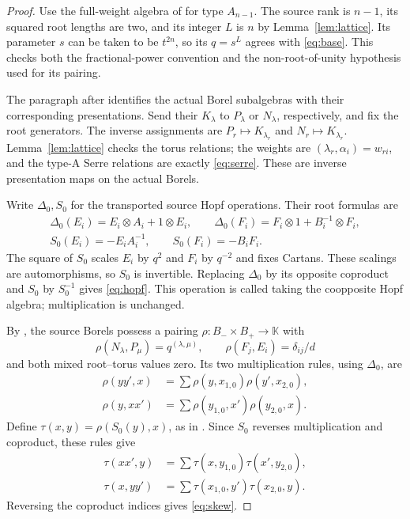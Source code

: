 \documentclass[11pt]{article}
\theoremstyle{definition}
\theoremstyle{remark}
\newcommand{\kk}{\mathbb{K}}
\begin{document}
\begin{proof}
Use the full-weight algebra of \cite[Definition 2.13]{VY} for type $A_{n-1}$. The source rank is $n-1$, its squared root lengths are two, and its integer $L$ is $n$ by Lemma~\ref{lem:lattice}. Its parameter $s$ can be taken to be $t^{2n}$, so its $q=s^L$ agrees with \eqref{eq:base}. This checks both the fractional-power convention and the non-root-of-unity hypothesis used for its pairing.

The paragraph after \cite[Proposition 2.14]{VY} identifies the actual Borel subalgebras with their corresponding presentations. Send their $K_\lambda$ to $P_\lambda$ or $N_\lambda$, respectively, and fix the root generators. The inverse assignments are $P_r\mapsto K_{\lambda_r}$ and $N_r\mapsto K_{\lambda_r}$. Lemma~\ref{lem:lattice} checks the torus relations; the weights are $(\lambda_r,\alpha_i)=w_{ri}$, and the type-A Serre relations are exactly \eqref{eq:serre}. These are inverse presentation maps on the actual Borels.

Write $\Delta_0,S_0$ for the transported source Hopf operations. Their root formulas are
\[
 \begin{gathered}
 \Delta_0(E_i)=E_i\otimes A_i+1\otimes E_i,\qquad
 \Delta_0(F_i)=F_i\otimes1+B_i^{-1}\otimes F_i,\\
 S_0(E_i)=-E_iA_i^{-1},\qquad S_0(F_i)=-B_iF_i.
 \end{gathered}
\]
The square of $S_0$ scales $E_i$ by $q^2$ and $F_i$ by $q^{-2}$ and fixes Cartans. These scalings are automorphisms, so $S_0$ is invertible. Replacing $\Delta_0$ by its opposite coproduct and $S_0$ by $S_0^{-1}$ gives \eqref{eq:hopf}. This operation is called taking the coopposite Hopf algebra; multiplication is unchanged.

By \cite[Proposition 2.73]{VY}, the source Borels possess a pairing $\rho:B_-\times B_+\to\kk$ with
\[
 \rho(N_\lambda,P_\mu)=q^{(\lambda,\mu)},\qquad
 \rho(F_j,E_i)=\delta_{ij}/d
\]
and both mixed root--torus values zero. Its two multiplication rules, using $\Delta_0$, are
\[
 \begin{aligned}
 \rho(yy',x)&=\sum\rho(y,x_{1,0})\rho(y',x_{2,0}),\\
 \rho(y,xx')&=\sum\rho(y_{1,0},x')\rho(y_{2,0},x).
 \end{aligned}
\]
Define $\tau(x,y)=\rho(S_0(y),x)$, as in \cite[Definition 2.74]{VY}. Since $S_0$ reverses multiplication and coproduct, these rules give
\[
 \begin{aligned}
 \tau(xx',y)&=\sum\tau(x,y_{1,0})\tau(x',y_{2,0}),\\
 \tau(x,yy')&=\sum\tau(x_{1,0},y')\tau(x_{2,0},y).
 \end{aligned}
\]
Reversing the coproduct indices gives \eqref{eq:skew}.


\end{proof}
\end{document}

